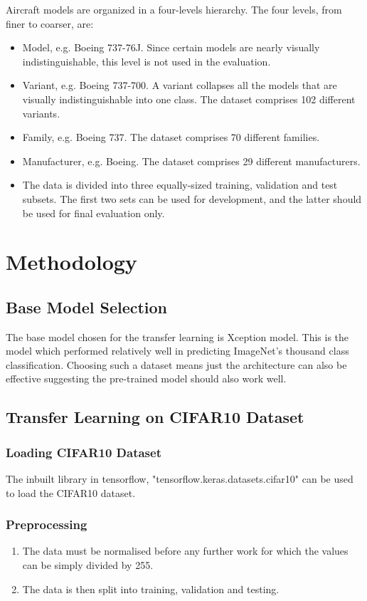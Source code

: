 \documentclass[conference,compsoc]{IEEEtran}
\begin{document}
Aircraft models are organized in a four-levels hierarchy. The four levels, from finer to coarser, are:

\begin{itemize}
    \item Model, e.g. Boeing 737-76J. Since certain models are nearly visually indistinguishable, this level is not used in the evaluation.
    \item Variant, e.g. Boeing 737-700. A variant collapses all the models that are visually indistinguishable into one class. The dataset comprises 102 different variants.
    \item Family, e.g. Boeing 737. The dataset comprises 70 different families.
    \item Manufacturer, e.g. Boeing. The dataset comprises 29 different manufacturers.
    \item The data is divided into three equally-sized training, validation and test subsets. The first two sets can be used for development, and the latter should be used for final evaluation only.
\end{itemize}

\section{Methodology}
\subsection{Base Model Selection}
The base model chosen for the transfer learning is Xception model. This is the model which performed relatively well in predicting ImageNet's thousand class classification. Choosing such a dataset means just the architecture can also be effective suggesting the pre-trained model should also work well.

\subsection{Transfer Learning on CIFAR10 Dataset}
\subsubsection{Loading CIFAR10 Dataset}
The inbuilt library in tensorflow, "tensorflow.keras.datasets.cifar10" can be used to load the CIFAR10 dataset.

\subsubsection{Preprocessing}
\begin{enumerate}
    \item The data must be normalised before any further work for which the values can be simply divided by 255.
    \item The data is then split into training, validation and testing.
\end{enumerate}
\end{document}
